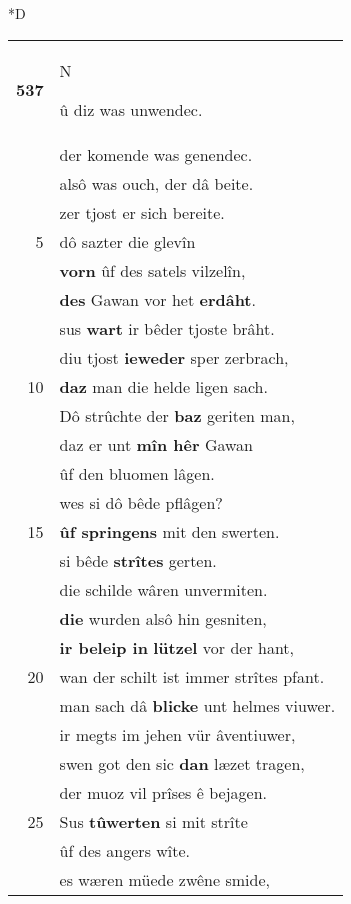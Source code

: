 \documentclass[8pt,a4paper,notitlepage]{article}
\begin{document}
\begin{table}[ht]
\begin{minipage}[t]{0.5\linewidth}
\small
\begin{center}*D
\end{center}
\begin{tabular}{rl}
\textbf{537} & \begin{large}N\end{large}û diz was unwendec.\\ 
 & der komende was genendec.\\ 
 & alsô was ouch, der dâ beite.\\ 
 & zer tjost er sich bereite.\\ 
5 & dô sazter die glevîn\\ 
 & \textbf{vorn} ûf des satels vilzelîn,\\ 
 & \textbf{des} Gawan vor het \textbf{erdâht}.\\ 
 & sus \textbf{wart} ir bêder tjoste brâht.\\ 
 & diu tjost \textbf{ieweder} sper zerbrach,\\ 
10 & \textbf{daz} man die helde ligen sach.\\ 
 & Dô strûchte der \textbf{baz} geriten man,\\ 
 & daz er unt \textbf{mîn hêr} Gawan\\ 
 & ûf den bluomen lâgen.\\ 
 & wes si dô bêde pflâgen?\\ 
15 & \textbf{ûf springens} mit den swerten.\\ 
 & si bêde \textbf{strîtes} gerten.\\ 
 & die schilde wâren unvermiten.\\ 
 & \textbf{die} wurden alsô hin gesniten,\\ 
 & \textbf{ir beleip in} \textbf{lützel} vor der hant,\\ 
20 & wan der schilt ist immer strîtes pfant.\\ 
 & man sach dâ \textbf{blicke} unt helmes viuwer.\\ 
 & ir megts im jehen vür âventiuwer,\\ 
 & swen got den sic \textbf{dan} læzet tragen,\\ 
 & der muoz vil prîses ê bejagen.\\ 
25 & Sus \textbf{tûwerten} si mit strîte\\ 
 & ûf des angers wîte.\\ 
 & es wæren müede zwêne smide,\\ 

\end{tabular}
\end{minipage}
\end{table}
\end{document}
